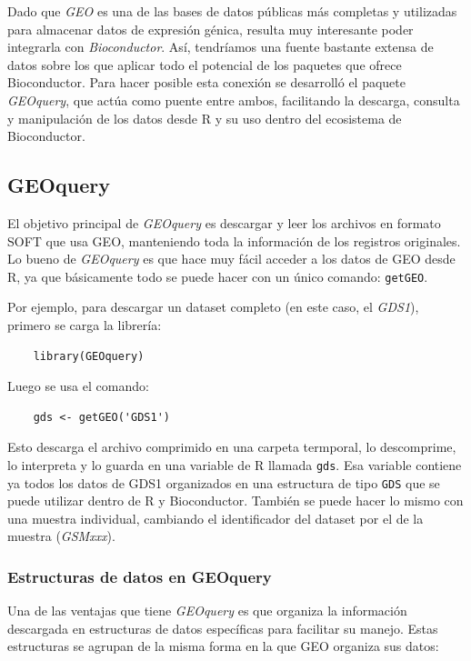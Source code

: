 Dado que \textit{GEO} es una de las bases de datos públicas más completas y utilizadas para almacenar datos de expresión génica, resulta muy interesante
poder integrarla con \textit{Bioconductor}. Así, tendríamos una fuente bastante extensa de datos sobre los que aplicar todo el potencial de los paquetes 
que ofrece Bioconductor. Para hacer posible esta conexión se desarrolló el paquete \textit{GEOquery}, que actúa como puente entre ambos, facilitando la 
descarga, consulta y manipulación de los datos desde R y su uso dentro del ecosistema de Bioconductor.

\subsection{GEOquery}

El objetivo principal de \textit{GEOquery} es descargar y leer los archivos en formato SOFT que usa GEO, manteniendo toda la información de los registros 
originales. Lo bueno de \textit{GEOquery} es que hace muy fácil acceder a los datos de GEO desde R, ya que básicamente todo se puede hacer con un único comando:
\texttt{getGEO}. \newline

Por ejemplo, para descargar un dataset completo (en este caso, el \textit{GDS1}), primero se carga la librería:

\begin{verbatim}
    library(GEOquery)
\end{verbatim}

Luego se usa el comando:

\begin{verbatim}
    gds <- getGEO('GDS1')
\end{verbatim}

Esto descarga el archivo comprimido en una carpeta termporal, lo descomprime, lo interpreta y lo guarda en una variable de R llamada \texttt{gds}. Esa
variable contiene ya todos los datos de GDS1 organizados en una estructura de tipo \texttt{GDS} que se puede utilizar dentro de R y Bioconductor. También
se puede hacer lo mismo con una muestra individual, cambiando el identificador del dataset por el de la muestra (\textit{GSMxxx}).

\subsubsection{Estructuras de datos en GEOquery}

Una de las ventajas que tiene \textit{GEOquery} es que organiza la información descargada en estructuras de datos específicas para facilitar su manejo. Estas
estructuras se agrupan de la misma forma en la que GEO organiza sus datos:


